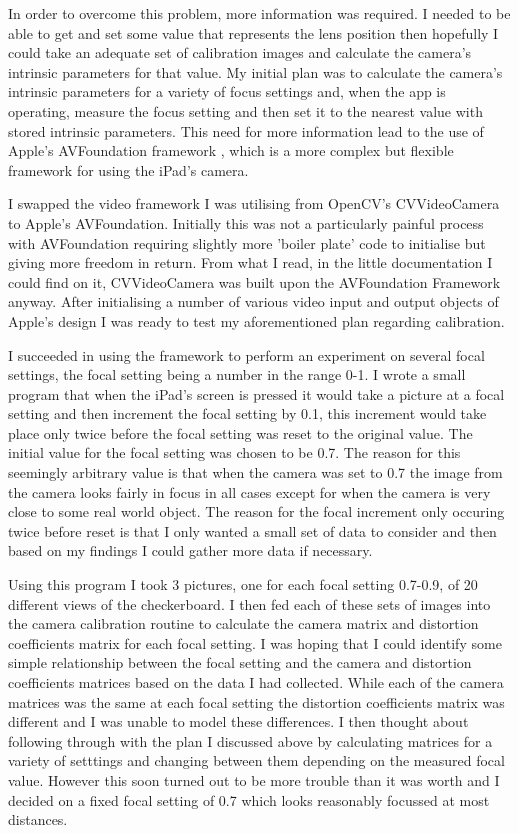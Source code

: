 \documentclass{article}
\begin{document}
In order to overcome this problem, more information was required. I needed to be able to get and set some value that represents the lens position \cite{xamarin} then hopefully I could take an adequate set of calibration images and calculate the camera's intrinsic parameters for that value. My initial plan was to calculate the camera's intrinsic parameters for a variety of focus settings and, when the app is operating, measure the focus setting and then set it to the nearest value with stored intrinsic parameters. This need for more information lead to the use of Apple's AVFoundation framework \cite{apple_class}, which is a more complex but flexible framework for using the iPad's camera. 

I swapped the video framework I was utilising from OpenCV's CVVideoCamera to Apple's AVFoundation. Initially this was not a particularly painful process with AVFoundation requiring slightly more 'boiler plate' code to initialise but giving more freedom in return. From what I read, in the little documentation I could find on it, CVVideoCamera was built upon the AVFoundation Framework anyway. After initialising a number of various video input and output objects of Apple's design I was ready to test my aforementioned plan regarding calibration. 

I succeeded in using the framework to perform an experiment on several focal settings, the focal setting being a number in the range 0-1. I wrote a small program that when the iPad's screen is pressed it would take a picture at a focal setting and then increment the focal setting by 0.1, this increment would take place only twice before the focal setting was reset to the original value. The initial value for the focal setting was chosen to be 0.7. The reason for this seemingly arbitrary value is that when the camera was set to 0.7 the image from the camera looks fairly in focus in all cases except for when the camera is very close to some real world object. The reason for the focal increment only occuring twice before reset is that I only wanted a small set of data to consider and then based on my findings I could gather more data if necessary. \par

Using this program I took 3 pictures, one for each focal setting 0.7-0.9, of 20 different views of the checkerboard. I then fed each of these sets of images into the camera calibration routine to calculate the camera matrix and distortion coefficients matrix for each focal setting. I was hoping that I could identify some simple relationship between the focal setting and the camera and distortion coefficients matrices based on the data I had collected. While each of the camera matrices was the same at each focal setting the distortion coefficients matrix was different and I was unable to model these differences. I then thought about following through with the plan I discussed above by calculating matrices for a variety of setttings and changing between them depending on the measured focal value. However this soon turned out to be more trouble than it was worth and I decided on a fixed focal setting of 0.7 which looks reasonably focussed at most distances.
\end{document}
